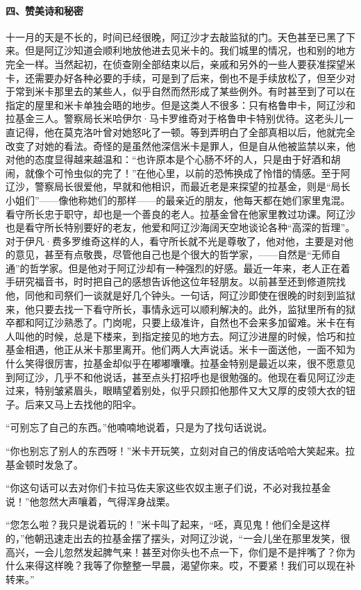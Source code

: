 \paragraph*{四、赞美诗和秘密}
\par 十一月的天是不长的，时间已经很晚，阿辽沙才去敲监狱的门。天色甚至已黑了下来。但是阿辽沙知道会顺利地放他进去见米卡的。我们城里的情况，也和别的地方完全一样。当然起初，在侦查刚全部结束以后，亲戚和另外的一些人要获准探望米卡，还需要办好各种必要的手续，可是到了后来，倒也不是手续放松了，但至少对于常到米卡那里去的某些人，似乎自然而然形成了某些例外。有时甚至到了可以在指定的屋里和米卡单独会晤的地步。但是这类人不很多：只有格鲁申卡，阿辽沙和拉基金三人。警察局长米哈伊尔·马卡罗维奇对于格鲁申卡特别优待。这老头儿一直记得，他在莫克洛叶曾对她怒叱了一顿。等到弄明白了全部真相以后，他就完全改变了对她的看法。奇怪的是虽然他深信米卡是罪人，但是自从他被监禁以来，他对他的态度显得越来越温和：“也许原本是个心肠不坏的人，只是由于好酒和胡闹，就像个可怜虫似的完了！”在他心里，以前的恐怖换成了怜惜的情感。至于阿辽沙，警察局长很爱他，早就和他相识，而最近老是来探望的拉基金，则是“局长小姐们”——像他称她们的那样——的最亲近的朋友，他每天都在她们家里鬼混。看守所长忠于职守，却也是一个善良的老人。拉基金曾在他家里教过功课。阿辽沙也是看守所长特别要好的老友，他爱和阿辽沙海阔天空地谈论各种“高深的哲理”。对于伊凡·费多罗维奇这样的人，看守所长就不光是尊敬了，他对他，主要是对他的意见，甚至有点敬畏，尽管他自己也是个很大的哲学家，——自然是“无师自通”的哲学家。但是他对于阿辽沙却有一种强烈的好感。最近一年来，老人正在着手研究福音书，时时把自己的感想告诉他这位年轻朋友。以前甚至还到修道院找他，同他和司祭们一谈就是好几个钟头。一句话，阿辽沙即使在很晚的时刻到监狱来，他只要去找一下看守所长，事情永远可以顺利解决的。此外，监狱里所有的狱卒都和阿辽沙熟悉了。门岗呢，只要上级准许，自然也不会来多加留难。米卡在有人叫他的时候，总是下楼来，到指定接见的地方去。阿辽沙进屋的时候，恰巧和拉基金相遇，他正从米卡那里离开。他们两人大声说话。米卡一面送他，一面不知为什么笑得很厉害，拉基金却似乎在嘟嘟囔囔。拉基金特别是最近以来，很不愿意见到阿辽沙，几乎不和他说话，甚至点头打招呼也是很勉强的。他现在看见阿辽沙走过来，特别皱紧眉头，眼睛望着别处，似乎只顾扣他那件又大又厚的皮领大衣的钮子。后来又马上去找他的阳伞。
\par “可别忘了自己的东西。”他喃喃地说着，只是为了找句话说说。
\par “你也别忘了别人的东西呀！”米卡开玩笑，立刻对自己的俏皮话哈哈大笑起来。拉基金顿时发急了。
\par “你这句话可以去对你们卡拉马佐夫家这些农奴主崽子们说，不必对我拉基金说！”他忽然大声嚷着，气得浑身战栗。
\par “您怎么啦？我只是说着玩的！”米卡叫了起来，“呸，真见鬼！他们全是这样的，”他朝迅速走出去的拉基金摆了摆头，对阿辽沙说，“一会儿坐在那里发笑，很高兴，一会儿忽然发起脾气来！甚至对你头也不点一下，你们是不是拌嘴了？你为什么来得这样晚？我等了你整整一早晨，渴望你来。哎，不要紧！我们可以现在补转来。”

